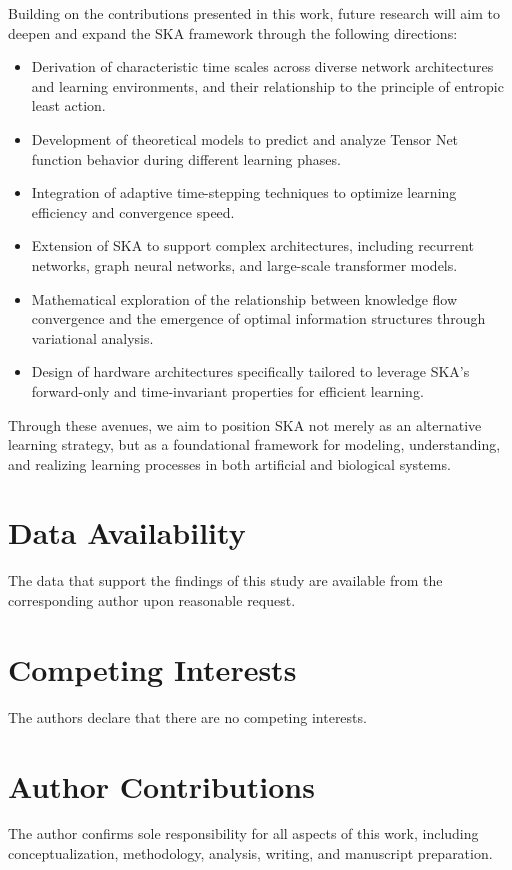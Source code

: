 \documentclass{article}
\begin{document}
Building on the contributions presented in this work, future research will aim to deepen and expand the SKA framework through the following directions:

\begin{itemize}
    \item Derivation of characteristic time scales across diverse network architectures and learning environments, and their relationship to the principle of entropic least action.
    \item Development of theoretical models to predict and analyze Tensor Net function behavior during different learning phases.
    \item Integration of adaptive time-stepping techniques to optimize learning efficiency and convergence speed.
    \item Extension of SKA to support complex architectures, including recurrent networks, graph neural networks, and large-scale transformer models.
    \item Mathematical exploration of the relationship between knowledge flow convergence and the emergence of optimal information structures through variational analysis.
    \item Design of hardware architectures specifically tailored to leverage SKA’s forward-only and time-invariant properties for efficient learning.
\end{itemize}

Through these avenues, we aim to position SKA not merely as an alternative learning strategy, but as a foundational framework for modeling, understanding, and realizing learning processes in both artificial and biological systems.
	

\section*{Data Availability}
The data that support the findings of this study are available from the corresponding author upon reasonable request.
\section*{Competing Interests}
The authors declare that there are no competing interests.

\section*{Author Contributions}
The author confirms sole responsibility for all aspects of this work, including conceptualization, methodology, analysis, writing, and manuscript preparation.
\end{document}

